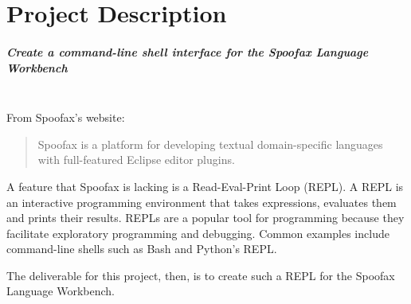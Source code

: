 \chapter{Project Description}
\label{cha:project-description}

\paragraph{Create a command-line shell interface for the Spoofax Language
Workbench}\mbox{}\\

From Spoofax's website:

\begin{quotation}
Spoofax is a platform for developing textual domain-specific languages with
full-featured Eclipse editor plugins.
\end{quotation}

A feature that Spoofax is lacking is a Read-Eval-Print Loop (REPL). A REPL is an
interactive programming environment that takes expressions, evaluates them and
prints their results. REPLs are a popular tool for programming because they
facilitate exploratory programming and debugging. Common examples include
command-line shells such as Bash and Python's REPL.

The deliverable for this project, then, is to create such a REPL for the Spoofax
Language Workbench.

